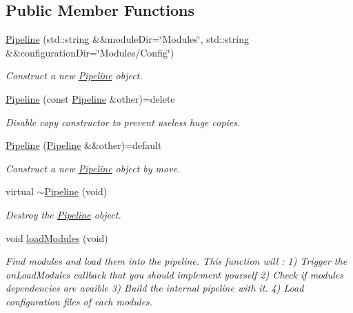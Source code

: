 \subsection*{Public Member Functions}
\begin{DoxyCompactItemize}
\item 
\mbox{\hyperlink{classo_z_1_1_pipeline_a5fc2efefb6e953ce5a4f8d7d3437619a}{Pipeline}} (std\+::string \&\&module\+Dir=\char`\"{}Modules\char`\"{}, std\+::string \&\&configuration\+Dir=\char`\"{}Modules/Config\char`\"{})
\begin{DoxyCompactList}\small\item\em Construct a new \mbox{\hyperlink{classo_z_1_1_pipeline}{Pipeline}} object. \end{DoxyCompactList}\item 
\mbox{\hyperlink{classo_z_1_1_pipeline_ab1d6cd9a6b71cae2b5ebe0031b945237}{Pipeline}} (const \mbox{\hyperlink{classo_z_1_1_pipeline}{Pipeline}} \&other)=delete
\begin{DoxyCompactList}\small\item\em Disable copy constructor to prevent useless huge copies. \end{DoxyCompactList}\item 
\mbox{\hyperlink{classo_z_1_1_pipeline_a6f9e61063bafb53108f1058f3de8c56a}{Pipeline}} (\mbox{\hyperlink{classo_z_1_1_pipeline}{Pipeline}} \&\&other)=default
\begin{DoxyCompactList}\small\item\em Construct a new \mbox{\hyperlink{classo_z_1_1_pipeline}{Pipeline}} object by move. \end{DoxyCompactList}\item 
virtual \mbox{\hyperlink{classo_z_1_1_pipeline_ae273add0ea7490c0ca4c13cb3683ec6f}{$\sim$\+Pipeline}} (void)
\begin{DoxyCompactList}\small\item\em Destroy the \mbox{\hyperlink{classo_z_1_1_pipeline}{Pipeline}} object. \end{DoxyCompactList}\item 
void \mbox{\hyperlink{classo_z_1_1_pipeline_a2815743412c13100c68fee0d87283417}{load\+Modules}} (void)
\begin{DoxyCompactList}\small\item\em Find modules and load them into the pipeline. This function will \+: 1) Trigger the on\+Load\+Modules callback that you should implement yourself 2) Check if modules dependencies are avaible 3) Build the internal pipeline with it. 4) Load configuration files of each modules. \end{DoxyCompactList}\item 

\end{DoxyCompactItemize}
